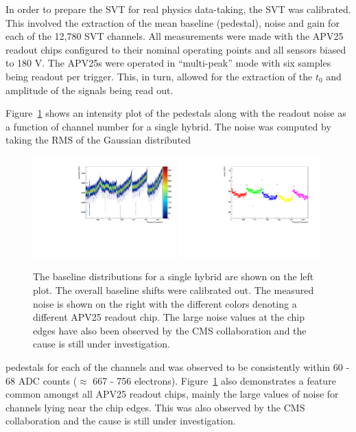 
%
%

In order to prepare the SVT for real physics data-taking, the SVT was 
calibrated. This involved the extraction of the mean baseline (pedestal),
noise and gain for each of the 12,780 SVT channels. All measurements
were made with the APV25 readout chips configured to their nominal operating
points \cite{Jones:1069892} and all sensors biased to 180 V. The APV25s were
operated in ``multi-peak'' mode with six samples being readout per trigger.
This, in turn, allowed for the extraction of the $t_0$ and amplitude of the 
signals being read out.

Figure~\ref{fig:pedestal_noise} shows an intensity plot of the pedestals 
along with the readout noise as a function of channel number for a single
hybrid.  The noise was computed by taking the RMS of the Gaussian distributed
\begin{figure}[h]
    \begin{center}
    	\includegraphics[width=0.49\textwidth]{test2012/svtperformance/svt_calib/baseline_v_ch_fpga0_hybrid0.pdf}
    	\includegraphics[width=0.49\textwidth]{test2012/svtperformance/svt_calib/noise_v_ch_fpga0_hybrid0_0.pdf}
        \caption{The baseline distributions for a single hybrid are shown on
                 the left plot. The overall baseline shifts were calibrated 
                 out. The measured noise is shown on the right with the 
                 different colors denoting a different APV25 readout chip.  
                 The large noise values at the chip edges have also been 
                 observed by the CMS collaboration and the cause is still 
                 under investigation.
                 } 
	\label{fig:pedestal_noise}
    \end{center}
\end{figure}
pedestals for each of the channels and was observed to be consistently within 
60 - 68 ADC counts ($\approx$ 667 - 756 electrons).  
Figure~\ref{fig:pedestal_noise} also demonstrates a feature common amongst 
all APV25 readout chips, mainly the large values of noise for channels 
lying near the chip edges.  This was also  observed by the CMS 
collaboration and the cause is still under investigation.

